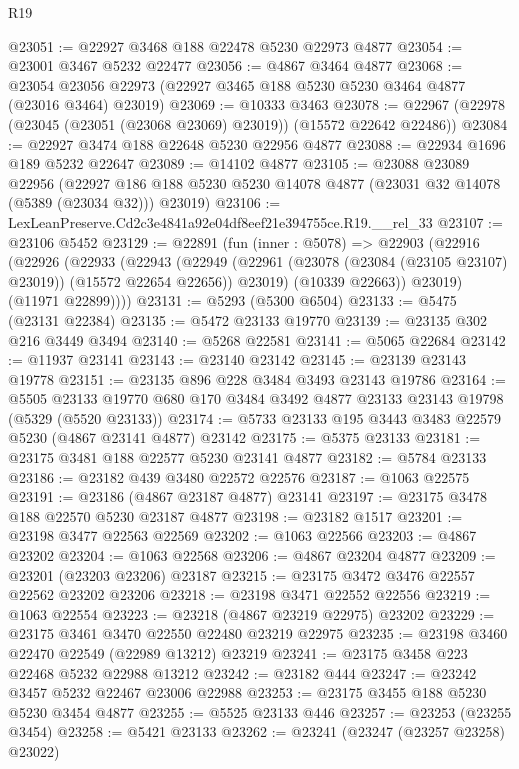\begin{lexlean}{R19}
\begin{coremodule}
@23051 := @22927 @3468 @188 @22478 @5230 @22973 @4877
@23054 := @23001 @3467 @5232 @22477
@23056 := @4867 @3464 @4877
@23068 := @23054 @23056 @22973 (@22927 @3465 @188 @5230 @5230 @3464 @4877 (@23016 @3464) @23019)
@23069 := @10333 @3463
@23078 := @22967 (@22978 (@23045 (@23051 (@23068 @23069) @23019)) (@15572 @22642 @22486))
@23084 := @22927 @3474 @188 @22648 @5230 @22956 @4877
@23088 := @22934 @1696 @189 @5232 @22647
@23089 := @14102 @4877
@23105 := @23088
    @23089
    @22956
    (@22927 @186 @188 @5230 @5230 @14078 @4877 (@23031 @32 @14078 (@5389 (@23034 @32))) @23019)
@23106 := LexLeanPreserve.Cd2c3e4841a92e04df8eef21e394755ce.R19.__rel_33
@23107 := @23106 @5452
@23129 := @22891
    (fun (inner : @5078) =>
    @22903
      (@22916
        (@22926
          (@22933
            (@22943
              (@22949
                (@22961 (@23078 (@23084 (@23105 @23107) @23019)) (@15572 @22654 @22656))
                @23019)
              (@10339 @22663))
            @23019)
          (@11971 @22899))))
@23131 := @5293 (@5300 @6504)
@23133 := @5475 (@23131 @22384)
@23135 := @5472 @23133 @19770
@23139 := @23135 @302 @216 @3449 @3494
@23140 := @5268 @22581
@23141 := @5065 @22684
@23142 := @11937 @23141
@23143 := @23140 @23142
@23145 := @23139 @23143 @19778
@23151 := @23135 @896 @228 @3484 @3493 @23143 @19786
@23164 := @5505
    @23133
    @19770
    @680
    @170
    @3484
    @3492
    @4877
    @23133
    @23143
    @19798
    (@5329 (@5520 @23133))
@23174 := @5733 @23133 @195 @3443 @3483 @22579 @5230 (@4867 @23141 @4877) @23142
@23175 := @5375 @23133
@23181 := @23175 @3481 @188 @22577 @5230 @23141 @4877
@23182 := @5784 @23133
@23186 := @23182 @439 @3480 @22572 @22576
@23187 := @1063 @22575
@23191 := @23186 (@4867 @23187 @4877) @23141
@23197 := @23175 @3478 @188 @22570 @5230 @23187 @4877
@23198 := @23182 @1517
@23201 := @23198 @3477 @22563 @22569
@23202 := @1063 @22566
@23203 := @4867 @23202
@23204 := @1063 @22568
@23206 := @4867 @23204 @4877
@23209 := @23201 (@23203 @23206) @23187
@23215 := @23175 @3472 @3476 @22557 @22562 @23202 @23206
@23218 := @23198 @3471 @22552 @22556
@23219 := @1063 @22554
@23223 := @23218 (@4867 @23219 @22975) @23202
@23229 := @23175 @3461 @3470 @22550 @22480 @23219 @22975
@23235 := @23198 @3460 @22470 @22549 (@22989 @13212) @23219
@23241 := @23175 @3458 @223 @22468 @5232 @22988 @13212
@23242 := @23182 @444
@23247 := @23242 @3457 @5232 @22467 @23006 @22988
@23253 := @23175 @3455 @188 @5230 @5230 @3454 @4877
@23255 := @5525 @23133 @446
@23257 := @23253 (@23255 @3454)
@23258 := @5421 @23133
@23262 := @23241 (@23247 (@23257 @23258) @23022)

\end{coremodule}
\end{lexlean}
